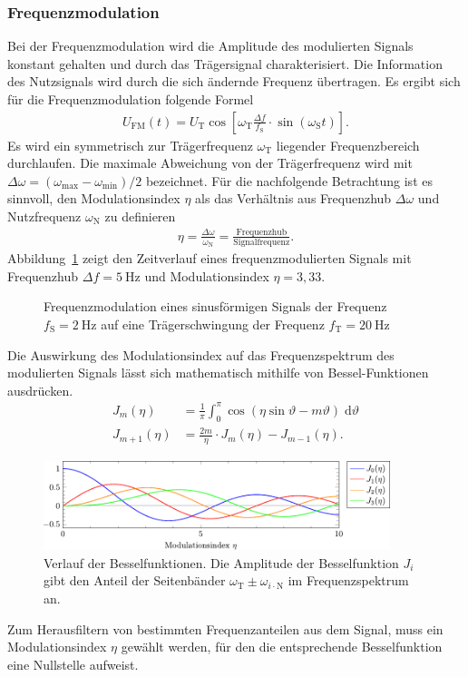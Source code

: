 \documentclass[a4paper,twoside,final]{article}
\begin{document}
\subsubsection{Frequenzmodulation}
Bei der Frequenzmodulation wird die Amplitude des modulierten Signals konstant gehalten und durch das Trägersignal charakterisiert. Die Information des Nutzsignals wird durch die sich ändernde Frequenz übertragen. Es ergibt sich für die Frequenzmodulation folgende Formel
\begin{align}
  U_\text{FM}(t) = U_\text{T} \cos\left[\omega_\text{T} \frac{\Delta f}{f_\text{S}}\cdot \sin(\omega_\text{S}t)\right].
\end{align}
Es wird ein symmetrisch zur Trägerfrequenz $\omega_\text{T}$ liegender Frequenzbereich durchlaufen. Die maximale Abweichung von der Trägerfrequenz wird mit $\Delta \omega = (\omega_\text{max}-\omega_\text{min})/2$ bezeichnet. Für die nachfolgende Betrachtung ist es sinnvoll, den Modulationsindex $\eta$ als das Verhältnis aus Frequenzhub $\Delta \omega$ und Nutzfrequenz $\omega_\text{N}$ zu definieren
\begin{align}
  \eta = \frac{\Delta \omega}{\omega_\text{N}} = \frac{\text{Frequenzhub}}{\text{Signalfrequenz}}.
\end{align}
Abbildung~\ref{fig:FM} zeigt den Zeitverlauf eines frequenzmodulierten Signals mit Frequenzhub $\Delta f = \SI{5}{\hertz}$ und Modulationsindex $\eta = 3,33$.
\begin{figure}[htp]
    \centering
        
    \caption{Frequenzmodulation eines sinusförmigen Signals der Frequenz $f_\text{S} = \SI{2}{\hertz}$ auf eine Trägerschwingung der Frequenz $f_\text{T} = \SI{20}{\hertz}$}
    \label{fig:FM}
\end{figure}
\FloatBarrier
\noindent
Die Auswirkung des Modulationsindex auf das Frequenzspektrum des modulierten Signals lässt sich mathematisch mithilfe von Bessel-Funktionen ausdrücken.
\begin{align}
    J_m(\eta) &= \frac{1}{\pi}\int_0^\pi \cos(\eta\sin \vartheta - m\vartheta)\; \text{d}\vartheta\\
    J_{m+1} (\eta) &= \frac{2m}{\eta} \cdot J_m(\eta) - J_{m-1}(\eta).
\end{align}
\begin{figure}[htp]
    \centering
    \includegraphics[width=0.9\textwidth]{Schaltungen/Besselfunktion.pdf}
    \caption{Verlauf der Besselfunktionen. Die Amplitude der Besselfunktion $J_i$ gibt den Anteil der Seitenbänder $\omega_\text{T}\pm\omega_{i\cdot\text{N}}$ im Frequenzspektrum an.}
    \label{fig:Besselfunktionen}
\end{figure}
Zum Herausfiltern von bestimmten Frequenzanteilen aus dem Signal, muss ein Modulationsindex $\eta$ gewählt werden, für den die entsprechende Besselfunktion eine Nullstelle aufweist.
\end{document}
